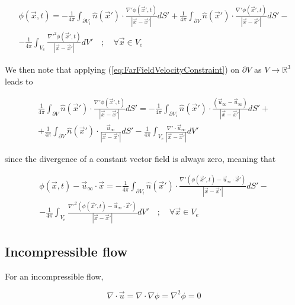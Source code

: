 \documentclass{article}
\begin{document}
\begin{multline*}
	\phi(\vec{x}, t) = - \frac{1}{4 \pi} \int_{\partial V_i}
	\hat{n}(\vec{x}') \cdot \frac{\nabla' \phi(\vec{x}', t)}{|\vec{x} -
	\vec{x}'|} dS' + \frac{1}{4 \pi} \int_{\partial V} \hat{n}(\vec{x}')
	\cdot \frac{\nabla' \phi(\vec{x}', t)}{|\vec{x} - \vec{x}'|} dS' - \\
	- \frac{1}{4 \pi} \int_{V_e} \frac{\nabla'^2 \phi(\vec{x}', t)}{|\vec{x}
	- \vec{x}'|} dV' \quad ; \quad \forall \vec{x} \in V_e
\end{multline*}

We then note that applying (\ref{eq:FarFieldVelocityConstraint}) on $\partial V$
as $V \rightarrow \mathbb{R}^3$ leads to

\begin{multline*}
	\frac{1}{4 \pi} \int_{\partial V} \hat{n}(\vec{x}') \cdot \frac{\nabla'
	\phi(\vec{x}', t)}{|\vec{x} - \vec{x}'|} dS' = - \frac{1}{4 \pi} \int_{
	\partial V_i} \hat{n}(\vec{x}') \cdot \frac{(\vec{u}_{\infty} -
	\vec{u}_{\infty})}{|\vec{x} - \vec{x}'|} dS' + \\
	+ \frac{1}{4 \pi} \int_{\partial V} \hat{n}(\vec{x}') \cdot \frac{
	\vec{u}_{\infty}}{|\vec{x} - \vec{x}'|} dS' - \frac{1}{4 \pi} \int_{V_e}
	\frac{\nabla' \cdot \vec{u}_{\infty}}{|\vec{x} - \vec{x}'|} dV'
\end{multline*}

since the divergence of a constant vector field is always zero, meaning that

\begin{multline}
\label{eq:HelmholtzDecomposedPhiInVe}
	\phi(\vec{x}, t) - \vec{u}_{\infty} \cdot \vec{x} = - \frac{1}{4 \pi}
	\int_{\partial V_i} \hat{n}(\vec{x}') \cdot \frac{\nabla' \left(
	\phi(\vec{x}', t) - \vec{u}_{\infty} \cdot \vec{x}' \right)}{|\vec{x} -
	\vec{x}'|} dS' - \\
	- \frac{1}{4 \pi} \int_{V_e} \frac{\nabla'^2 \left( \phi(\vec{x}', t) -
	\vec{u}_{\infty} \cdot \vec{x}' \right)}{|\vec{x} - \vec{x}'|} dV' \quad
	; \quad \forall \vec{x} \in V_e
\end{multline}

\subsection{Incompressible flow}

For an incompressible flow,

\begin{equation}
\label{eq:IncompressiblePotentialFlowEquation}
	\nabla \cdot \vec{u} = \nabla \cdot \nabla \phi = \nabla^2 \phi = 0
\end{equation}
\end{document}

